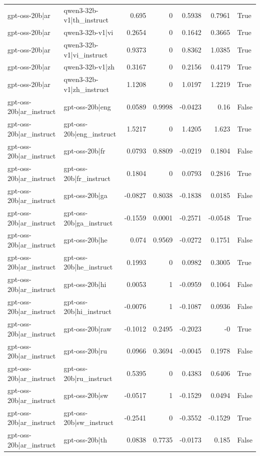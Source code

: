 \begin{table}
\begin{tabular}{l l r r r r l}
gpt-oss-20b|ar & qwen3-32b-v1|th_instruct & 0.695 & 0 & 0.5938 & 0.7961 & True \\
gpt-oss-20b|ar & qwen3-32b-v1|vi & 0.2654 & 0 & 0.1642 & 0.3665 & True \\
gpt-oss-20b|ar & qwen3-32b-v1|vi_instruct & 0.9373 & 0 & 0.8362 & 1.0385 & True \\
gpt-oss-20b|ar & qwen3-32b-v1|zh & 0.3167 & 0 & 0.2156 & 0.4179 & True \\
gpt-oss-20b|ar & qwen3-32b-v1|zh_instruct & 1.1208 & 0 & 1.0197 & 1.2219 & True \\
gpt-oss-20b|ar_instruct & gpt-oss-20b|eng & 0.0589 & 0.9998 & -0.0423 & 0.16 & False \\
gpt-oss-20b|ar_instruct & gpt-oss-20b|eng_instruct & 1.5217 & 0 & 1.4205 & 1.623 & True \\
gpt-oss-20b|ar_instruct & gpt-oss-20b|fr & 0.0793 & 0.8809 & -0.0219 & 0.1804 & False \\
gpt-oss-20b|ar_instruct & gpt-oss-20b|fr_instruct & 0.1804 & 0 & 0.0793 & 0.2816 & True \\
gpt-oss-20b|ar_instruct & gpt-oss-20b|ga & -0.0827 & 0.8038 & -0.1838 & 0.0185 & False \\
gpt-oss-20b|ar_instruct & gpt-oss-20b|ga_instruct & -0.1559 & 0.0001 & -0.2571 & -0.0548 & True \\
gpt-oss-20b|ar_instruct & gpt-oss-20b|he & 0.074 & 0.9569 & -0.0272 & 0.1751 & False \\
gpt-oss-20b|ar_instruct & gpt-oss-20b|he_instruct & 0.1993 & 0 & 0.0982 & 0.3005 & True \\
gpt-oss-20b|ar_instruct & gpt-oss-20b|hi & 0.0053 & 1 & -0.0959 & 0.1064 & False \\
gpt-oss-20b|ar_instruct & gpt-oss-20b|hi_instruct & -0.0076 & 1 & -0.1087 & 0.0936 & False \\
gpt-oss-20b|ar_instruct & gpt-oss-20b|raw & -0.1012 & 0.2495 & -0.2023 & -0 & True \\
gpt-oss-20b|ar_instruct & gpt-oss-20b|ru & 0.0966 & 0.3694 & -0.0045 & 0.1978 & False \\
gpt-oss-20b|ar_instruct & gpt-oss-20b|ru_instruct & 0.5395 & 0 & 0.4383 & 0.6406 & True \\
gpt-oss-20b|ar_instruct & gpt-oss-20b|sw & -0.0517 & 1 & -0.1529 & 0.0494 & False \\
gpt-oss-20b|ar_instruct & gpt-oss-20b|sw_instruct & -0.2541 & 0 & -0.3552 & -0.1529 & True \\
gpt-oss-20b|ar_instruct & gpt-oss-20b|th & 0.0838 & 0.7735 & -0.0173 & 0.185 & False \\

\end{tabular}
\end{table}
